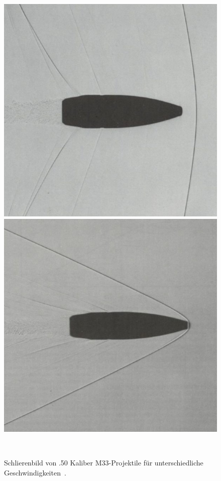 \begin{figure}
\begin{minipage}[b]{0.32\textwidth}
        \includegraphics[width=\linewidth]{papers/ueberschall/figures/1.06_mach_projektil.jpg}
        \caption*{$1.06\,\mathrm{Mach}$}
    \end{minipage}
    \hfill
    \begin{minipage}[b]{0.32\textwidth}
        \centering
        \includegraphics[width=\linewidth]{papers/ueberschall/figures/2.66_mach_projektil.jpg}
        \caption*{$2.66\,\mathrm{Mach}$}
    \end{minipage}
    \caption{Schlierenbild von .50 Kaliber M33-Projektile für unterschiedliche Geschwindigkeiten~\cite{Mittelkaliber2020}.}
~\label{fig:machsche_kegel_projektil}
\end{figure}
